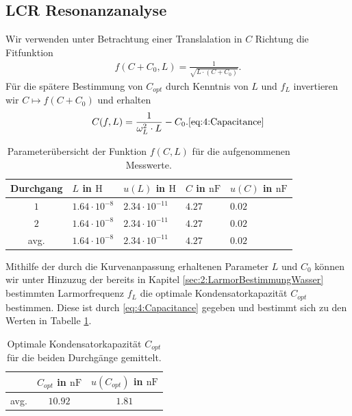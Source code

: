 \documentclass{article}
\begin{document}
    \subsection{LCR Resonanzanalyse}\label{subsec:4:LCRResonanzanalyse}
    Wir verwenden unter Betrachtung einer Translalation in $C$ Richtung die Fitfunktion
    \begin{align}
        f(C + C_0,L) = \frac{1}{\sqrt{L\cdot (C + C_0)}}.
    \end{align}
    Für die spätere Bestimmung von $C_{opt}$ durch Kenntnis von $L$ und $f_L$ invertieren wir $C\mapsto f(C + C_0)$ und erhalten 
    \begin{align}
        C(f,L) = \frac{1}{\omega_L^2\cdot L} - C_0. \ref{eq:4:Capacitance}
    \end{align}

    \begin{table}[h]
        \centering
        \begin{tabular}{c|ll|ll}
             \textbf{Durchgang} & $L$ in $\si{\henry}$ & $u(L)$ in $\si{\henry}$ & $C$ in $\si{\nano\farad}$ & $u(C)$ in $\si{\nano\farad}$ \\
            \hline
            $1$ & $1.64\cdot 10^{-8}$ & $2.34\cdot 10^{-11}$ & $4.27$ & $0.02$ \\
            $2$ & $1.64\cdot 10^{-8}$ & $2.34\cdot 10^{-11}$ & $4.27$ & $0.02$ \\
            \hline
            avg. & $1.64\cdot 10^{-8}$ & $2.34\cdot 10^{-11}$ & $4.27$ & $0.02$
        \end{tabular} 
        \caption{Parameterübersicht der Funktion $f(C,L)$ für die aufgenommenen Messwerte.}
    \end{table}

    Mithilfe der durch die Kurvenanpassung erhaltenen Parameter $L$ und $C_0$ können wir unter Hinzuzug der bereits in Kapitel \ref{sec:2:LarmorBestimmungWasser} bestimmten Larmorfrequenz $f_L$ die optimale Kondensatorkapazität $C_{opt}$ bestimmen. Diese ist durch \eqref{eq:4:Capacitance} gegeben und bestimmt sich zu den Werten in Tabelle \ref{tab:4:OptimalCapacitance}.
    \begin{table}
        \centering
        \begin{tabular}{c|cc}
            \hline
             & $C_{opt}$ in $\si{\nano\farad}$ & $u(C_{opt})$ in $\si{\nano\farad}$ \\
            \hline\hline
            avg. & $10.92$ & $1.81$\\
            \hline
        \end{tabular}
        \caption{Optimale Kondensatorkapazität $C_{opt}$ für die beiden Durchgänge gemittelt.}
        \label{tab:4:OptimalCapacitance}
    \end{table}
\end{document}
